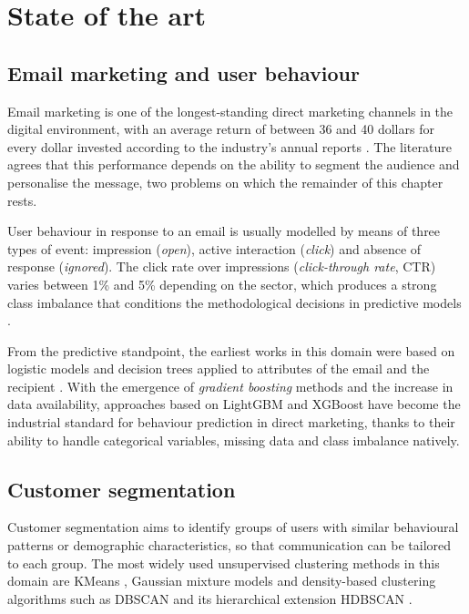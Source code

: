 \chapter{State of the art}
\label{cap:estado_arte}

\section{Email marketing and user behaviour}

Email marketing is one of the longest-standing direct marketing channels in the digital environment, with an average return of between 36 and 40 dollars for every dollar invested according to the industry's annual reports \cite{litmus2023}. The literature agrees that this performance depends on the ability to segment the audience and personalise the message, two problems on which the remainder of this chapter rests.

User behaviour in response to an email is usually modelled by means of three types of event: impression (\textit{open}), active interaction (\textit{click}) and absence of response (\textit{ignored}). The click rate over impressions (\textit{click-through rate}, CTR) varies between 1\% and 5\% depending on the sector, which produces a strong class imbalance that conditions the methodological decisions in predictive models \cite{chaffey2024}.

From the predictive standpoint, the earliest works in this domain were based on logistic models and decision trees applied to attributes of the email and the recipient \cite{sahni2016}. With the emergence of \textit{gradient boosting} methods and the increase in data availability, approaches based on LightGBM \cite{ke2017lightgbm} and XGBoost \cite{chen2016xgboost} have become the industrial standard for behaviour prediction in direct marketing, thanks to their ability to handle categorical variables, missing data and class imbalance natively.

\section{Customer segmentation}

Customer segmentation aims to identify groups of users with similar behavioural patterns or demographic characteristics, so that communication can be tailored to each group. The most widely used unsupervised clustering methods in this domain are KMeans \cite{macqueen1967}, Gaussian mixture models \cite{reynolds2009} and density-based clustering algorithms such as DBSCAN \cite{ester1996} and its hierarchical extension HDBSCAN \cite{campello2013}.

